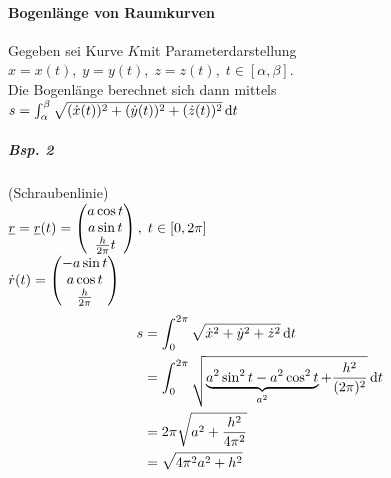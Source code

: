 \paragraph{Bogenlänge von Raumkurven} \parskp
Gegeben sei Kurve $K $mit Parameterdarstellung $x=x(t), \; y=y(t), \; z=z(t), \; t \in [\alpha
, \beta]$.\\
Die Bogenlänge berechnet sich dann mittels\\
$s=\int_{\alpha}^{\beta} \sqrt{(\dot{x}(t))^2+(\dot{y}(t))^2+(\dot{z}(t))^2}\,\mathrm{d}t$
\subparagraph{Bsp. 2} (Schraubenlinie)\\
$\underline{r}= \underline{r}(t)=\begin{pmatrix}a \cos t \\ a \sin t \\ \frac{h}{2\pi}t\end{pmatrix}, \; t \in [0,2\pi]$\\
$\dot{r}(t) = \begin{pmatrix}-a \sin t \\ a \cos t \\ \frac{h}{2\pi}\end{pmatrix}$
\begin{align*}
s&= \int_0^{2\pi} \sqrt{\dot{x}^2+\dot{y}^2+\dot{z}^2}\,\mathrm{d}t\\
&= \int_0^{2\pi} \sqrt{\underbrace{a^2 \sin^2t - a^2 \cos^2t}_{a^2}+\frac{h^2}{(2\pi)^2}}\,\mathrm{d}t\\
&= 2\pi \sqrt{a^2+\frac{h^2}{4\pi^2}}\\
&= \sqrt{4\pi^2a^2+h^2}
\end{align*}
